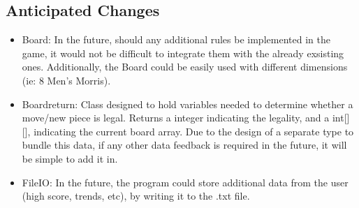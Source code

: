 \documentclass[12pt]{article}
\begin{document}
	\subsection{Anticipated Changes}
	\begin{itemize}
	\item Board: In the future, should any additional rules be implemented in the game, it would not be difficult to integrate them with the already exsisting ones.  
	Additionally, the Board could be easily used with different dimensions (ie: 8 Men's Morris).  
	\item    Boardreturn: Class designed to hold variables needed to determine whether a move/new piece is legal. Returns a integer indicating the legality, and a int[][], indicating the current board array. Due to the design of a separate type to bundle this data, if any other data feedback is required in the future, it will be simple to add it in.
	\item FileIO: In the future, the program could store additional data from the user (high score, trends, etc), by writing it to the .txt file.
	
	\end{itemize}
	
\end{document}
